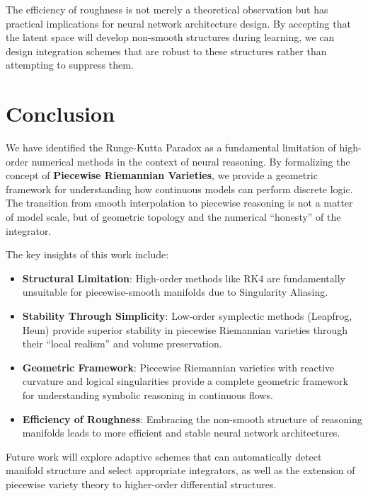 \documentclass[12pt,a4paper]{article}
\begin{document}
The efficiency of roughness is not merely a theoretical observation but has practical implications for neural network architecture design. By accepting that the latent space will develop non-smooth structures during learning, we can design integration schemes that are robust to these structures rather than attempting to suppress them.

\section{Conclusion}

We have identified the Runge-Kutta Paradox as a fundamental limitation of high-order numerical methods in the context of neural reasoning. By formalizing the concept of \textbf{Piecewise Riemannian Varieties}, we provide a geometric framework for understanding how continuous models can perform discrete logic. The transition from smooth interpolation to piecewise reasoning is not a matter of model scale, but of geometric topology and the numerical ``honesty'' of the integrator.

The key insights of this work include:

\begin{itemize}[leftmargin=1cm]
\item \textbf{Structural Limitation}: High-order methods like RK4 are fundamentally unsuitable for piecewise-smooth manifolds due to Singularity Aliasing.

\item \textbf{Stability Through Simplicity}: Low-order symplectic methods (Leapfrog, Heun) provide superior stability in piecewise Riemannian varieties through their ``local realism'' and volume preservation.

\item \textbf{Geometric Framework}: Piecewise Riemannian varieties with reactive curvature and logical singularities provide a complete geometric framework for understanding symbolic reasoning in continuous flows.

\item \textbf{Efficiency of Roughness}: Embracing the non-smooth structure of reasoning manifolds leads to more efficient and stable neural network architectures.
\end{itemize}

Future work will explore adaptive schemes that can automatically detect manifold structure and select appropriate integrators, as well as the extension of piecewise variety theory to higher-order differential structures.
\end{document}
